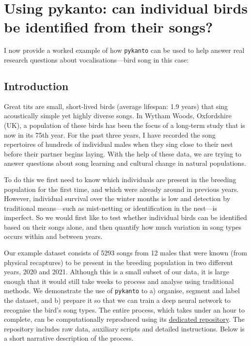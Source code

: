 \section{Using pykanto: can individual birds be identified from their songs?}

I now provide a worked example of how \texttt{pykanto} can be used to help answer real research questions about vocalisations---bird song in this case:

\subsection{Introduction}

Great tits are small, short-lived birds (average lifespan: 1.9 years) that sing
acoustically simple yet highly diverse songs. In Wytham Woods, Oxfordshire (UK),
a population of these birds has been the focus of a long-term study that is now
in its 75th year. For the past three years, I have recorded the song repertoires of
hundreds of individual males when they sing close to their nest before their
partner begins laying. With the help of these data, we are trying to answer
questions about song learning and cultural change in natural populations.

To do this we first need to know which individuals are present in the breeding
population for the first time, and which were already around in previous years.
However, individual survival over the winter months is low and detection by
traditional means---such as mist-netting or identification in the nest---is
imperfect. So we would first like to test whether individual birds can be
identified based on their songs alone, and then quantify how much variation in
song types occurs within and between years.

Our example dataset consists of 5293 songs from 12 males that were known (from
physical recaptures) to be present in the breeding population in two different
years, 2020 and 2021. Although this is a small subset of our data, it is large
enough that it would still take weeks to process and analyse using traditional
methods. We demonstrate the use of \texttt{pykanto} to a) organise, segment and label the
dataset, and b) prepare it so that we can train a deep neural network to
recognise the bird's song types. The entire process, which takes under an hour to complete,
can be computationally reproduced using its
\href{https://github.com/nilomr/pykanto-example}{dedicated
repository}. The repository includes
raw data, auxiliary scripts and detailed instructions. Below is a short
narrative description of the process.

